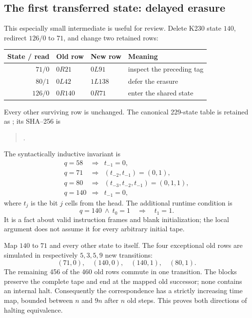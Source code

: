 \subsection{The first transferred state: delayed erasure}

This especially small intermediate is useful for review. Delete K230 state
$140$, redirect $126/0$ to $71$, and change two retained rows:
\begin{center}
\begin{tabular}{@{}rlll@{}}\toprule
State / read & Old row & New row & Meaning\\\midrule
$71/0$ & $0R21$ & $0L91$ & inspect the preceding tag\\
$80/1$ & $0L42$ & $1L138$ & defer the erasure\\
$126/0$ & $0R140$ & $0R71$ & enter the shared state\\
\bottomrule\end{tabular}
\end{center}
Every other surviving row is unchanged. The canonical 229-state table is
retained as ; its SHA--256 is
\begin{quote}\small
{}.
\end{quote}

The syntactically inductive invariant is
\[
\begin{array}{rcl}
q=58&\Rightarrow&t_{-1}=0,\\
q=71&\Rightarrow&(t_{-2},t_{-1})=(0,1),\\
q=80&\Rightarrow&(t_{-3},t_{-2},t_{-1})=(0,1,1),\\
q=140&\Rightarrow&t_{-1}=0,
\end{array}
\]
where $t_j$ is the bit $j$ cells from the head. The additional runtime
condition is
\[
                 q=140\ \land\ t_0=1\quad\Rightarrow\quad t_1=1.
\]
It is a fact about valid instruction frames and blank initialization;
the local argument does not assume it for every arbitrary initial tape.

Map $140$ to $71$ and every other state to itself. The four exceptional
old rows are simulated in respectively $5,3,5,9$ new transitions:
\[
          (71,0),\quad(140,0),\quad(140,1),\quad(80,1).
\]
The remaining 456 of the 460 old rows commute in one transition. The
blocks preserve the complete tape and end at the mapped old successor;
none contains an internal halt. Consequently the correspondence has
a strictly increasing time map, bounded between $n$ and $9n$ after
$n$ old steps. This proves both directions of halting equivalence.

